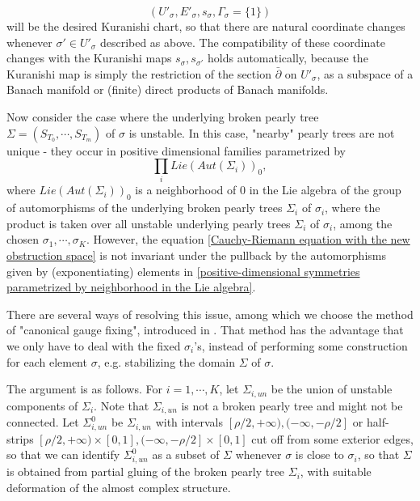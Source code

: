 \documentclass{amsart}
\numberwithin{equation}{section}
\numberwithin{figure}{section}
\begin{document}
\begin{equation}
(U'_{\sigma}, E'_{\sigma}, s_{\sigma}, \Gamma_{\sigma} = \{1\})
\end{equation}
will be the desired Kuranishi chart, so that there are natural coordinate changes whenever $\sigma' \in U'_{\sigma}$ described as above. The compatibility of these coordinate changes with the Kuranishi maps $s_{\sigma}, s_{\sigma'}$ holds automatically, because the Kuranishi map is simply the restriction of the section $\bar{\partial}$ on $U'_{\sigma}$, as a subspace of a Banach manifold or (finite) direct products of Banach manifolds. \par

	Now consider the case where the underlying broken pearly tree $\Sigma = (S_{T_{0}}, \cdots, S_{T_{m}})$ of $\sigma$ is unstable. In this case, "nearby" pearly trees are not unique - they occur in positive dimensional families parametrized by
\begin{equation}\label{positive-dimensional symmetries parametrized by neighborhood in the Lie algebra}
\prod_{i} Lie(Aut(\Sigma_{i}))_{0},
\end{equation}
where $Lie(Aut(\Sigma_{i}))_{0}$ is a neighborhood of $0$ in the Lie algebra of the group of automorphisms of the underlying broken pearly trees $\Sigma_{i}$ of $\sigma_{i}$, where the product is taken over all unstable underlying pearly trees $\Sigma_{i}$ of $\sigma_{i}$, among the chosen $\sigma_{1}, \cdots, \sigma_{K}$. However, the equation \eqref{Cauchy-Riemann equation with the new obstruction space} is not invariant under the pullback by the automorphisms given by (exponentiating) elements in \eqref{positive-dimensional symmetries parametrized by neighborhood in the Lie algebra}. \par
	There are several ways of resolving this issue, among which we choose the method of "canonical gauge fixing", introduced in \cite{Fukaya-Ono}. That method has the advantage that we only have to deal with the fixed $\sigma_{i}$'s, instead of performing some construction for each element $\sigma$, e.g. stabilizing the domain $\Sigma$ of $\sigma$. \par
	The argument is as follows. For $i = 1, \cdots, K$, let $\Sigma_{i, un}$ be the union of unstable components of $\Sigma_{i}$. Note that $\Sigma_{i, un}$ is not a broken pearly tree and might not be connected. Let $\Sigma_{i, un}^{0}$ be $\Sigma_{i, un}$ with intervals $[\rho/2, +\infty), (-\infty, -\rho/2]$ or half-strips $[\rho/2, +\infty) \times [0, 1], (-\infty, -\rho/2] \times [0, 1]$ cut off from some exterior edges, so that we can identify $\Sigma_{i, un}^{0}$ as a subset of $\Sigma$ whenever $\sigma$ is close to $\sigma_{i}$, so that $\Sigma$ is obtained from partial gluing of the broken pearly tree $\Sigma_{i}$, with suitable deformation of the almost complex structure. \par
\end{document}
